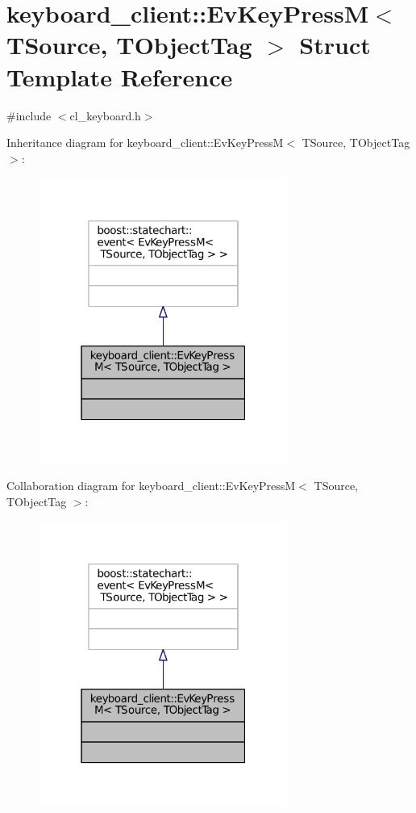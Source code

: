 \hypertarget{structkeyboard__client_1_1EvKeyPressM}{}\section{keyboard\+\_\+client\+:\+:Ev\+Key\+PressM$<$ T\+Source, T\+Object\+Tag $>$ Struct Template Reference}
\label{structkeyboard__client_1_1EvKeyPressM}


{\ttfamily \#include $<$cl\+\_\+keyboard.\+h$>$}



Inheritance diagram for keyboard\+\_\+client\+:\+:Ev\+Key\+PressM$<$ T\+Source, T\+Object\+Tag $>$\+:
\nopagebreak
\begin{figure}[H]
\begin{center}
\leavevmode
\includegraphics[width=232pt]{structkeyboard__client_1_1EvKeyPressM__inherit__graph}
\end{center}
\end{figure}


Collaboration diagram for keyboard\+\_\+client\+:\+:Ev\+Key\+PressM$<$ T\+Source, T\+Object\+Tag $>$\+:
\nopagebreak
\begin{figure}[H]
\begin{center}
\leavevmode
\includegraphics[width=232pt]{structkeyboard__client_1_1EvKeyPressM__coll__graph}
\end{center}
\end{figure}


